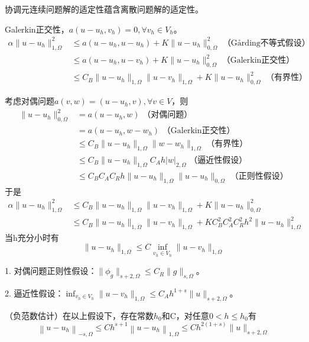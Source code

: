 \begin{pf}
  协调元连续问题解的适定性蕴含离散问题解的适定性。

  Galerkin正交性，$a(u - u_h, v_h) = 0, \forall v_h \in V_h$。
  \[
    \begin{aligned}
      \alpha \|u - u_h\|_{1, \Omega}^2 &\le a(u - u_h, u - u_h) + K \|u - u_h\|_{0, \Omega}^2 \text{ （Gårding不等式假设）}\\
      &\le a(u - u_h, u - v_h) + K \|u - u_h\|_{0, \Omega}^2 \text{ （Galerkin正交性）}\\
      &\le C_B \|u - u_h\|_{1, \Omega} \|u - v_h\|_{1, \Omega} + K \|u - u_h\|_{0, \Omega}^2 \text{ （有界性）}
    \end{aligned}
  \]

  考虑对偶问题$a(v, w) = (u - u_h, v), \forall v \in V$，则
  \[
    \begin{aligned}
      \|u - u_h\|_{0, \Omega}^2 &= a(u - u_h, w) \text{ （对偶问题）}\\
      &= a(u - u_h, w - w_h) \text{ （Galerkin正交性）}\\
      &\le C_B \|u - u_h\|_{1, \Omega} \|w - w_h\|_{1, \Omega} \text{ （有界性）}\\
      &\le C_B \|u - u_h\|_{1, \Omega} C_A h |w|_{2, \Omega} \text{ （逼近性假设）}\\
      &\le C_B C_A C_R h \|u - u_h\|_{1, \Omega} \|u - u_h\|_{0, \Omega} \text{ （正则性假设）}
    \end{aligned}
  \]
  于是
  \[
    \begin{aligned}
      \alpha \|u - u_h\|_{1, \Omega}^2 &\le C_B \|u - u_h\|_{1, \Omega} \|u - v_h\|_{1, \Omega} + K \|u - u_h\|_{0, \Omega}^2\\
      &\le C_B \|u - u_h\|_{1, \Omega} \|u - v_h\|_{1, \Omega} + K C_B^2 C_A^2 C_R^2 h^2 \|u - u_h\|_{1, \Omega}^2
    \end{aligned}
  \]
  当h充分小时有
  \[
    \|u - u_h\|_{1, \Omega} \le C \inf_{v_h \in V_h} \|u - v_h\|_{1, \Omega}
  \]
\end{pf}

1. 对偶问题正则性假设：$\|\phi_g\|_{s+2, \Omega} \le C_{R}\|g\|_{s, \Omega}$。

2. 逼近性假设：$\inf _{v_{h} \in V_{h}}\|u-v_h\|_{1, \Omega} \le C_A h^{1+s}\|u\|_{s+2, \Omega}$。

\begin{thm}
  （负范数估计）在以上假设下，存在常数$h_0$和C，对任意$0 < h \le h_0$有
  \[
    \left\|u-u_{h}\right\|_{-s, \Omega} \le C h^{s+1}\left\|u-u_{h}\right\|_{1, \Omega} \le C h^{2(1+s)}\|u\|_{s+2, \Omega}
  \]
\end{thm}


